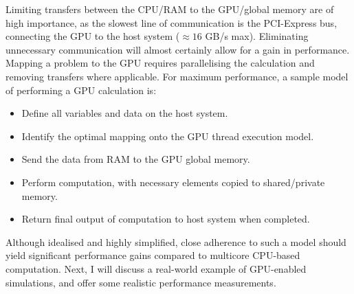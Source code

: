 Limiting transfers between the CPU/RAM to the GPU/global memory are of high importance, as the slowest line of communication is the PCI-Express bus, connecting the GPU to the host system ($\approx 16 $ GB/s max). Eliminating unnecessary communication will almost certainly allow for a gain in performance. Mapping a problem to the GPU requires parallelising the calculation and removing transfers where applicable. For maximum performance, a sample model of performing a GPU calculation is:
\begin{itemize}
    \item Define all variables and data on the host system.
    \item Identify the optimal mapping onto the GPU thread execution model.
    \item Send the data from RAM to the GPU global memory.
    \item Perform computation, with necessary elements copied to shared/private memory.
    \item Return final output of computation to host system when completed.
\end{itemize}

Although idealised and highly simplified, close adherence to such a model should yield significant performance gains compared to multicore CPU-based computation. Next, I will discuss a real-world example of GPU-enabled simulations, and offer some realistic performance measurements.

